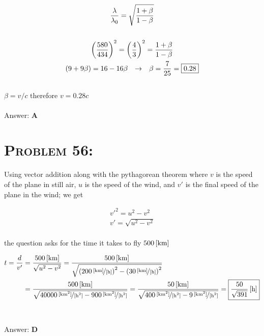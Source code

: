 \documentclass{article}
\begin{document}
\begin{gather}
\frac{\lambda}{\lambda_{0}} = \sqrt{\frac{1+\beta}{1-\beta}}\\
\nonumber\\
\left(\frac{580}{434}\right)^{2} = \left(\frac{4}{3}\right)^{2} = \frac{1+\beta}{1-\beta}\nonumber\\
(9 + 9 \beta) = 16 - 16 \beta \hspace{.1in} \rightarrow \hspace{.1in} \beta = \frac{7}{25} = \boxed{0.28}\nonumber
\end{gather}
\\
$\beta = v/c$ therefore $v = 0.28 c$
\\\\
Answer: \textbf{\textcolor{ProcessBlue}A}\\


\section{\textsc{Problem 56:}} Using vector addition along with the pythagorean theorem where $v$ is the speed of the plane in still air, $u$ is the speed of the wind, and $v'$ is the final speed of the plane in the wind; we get

\begin{gather}
v'^{2} = u^{2} - v^{2}\nonumber\\
v' = \sqrt{u^{2} - v^{2}}\nonumber
\end{gather}
\\
the question asks for the time it takes to fly $\unit[500]{[km]}$

\begin{align}
t = \frac{d}{v'} &= \frac{\unit[500]{[km]}}{\sqrt{u^{2} - v^{2}}} =  \frac{\unit[500]{[km]}}{\sqrt{\left(\unitfrac[200]{[km]}{[h]}\right)^{2} - \left(\unitfrac[30]{[km]}{[h]}\right)^{2}}}\nonumber\\
&= \frac{\unit[500]{[km]}}{\sqrt{\unitfrac[40000]{[km^{2}]}{[h^{2}]} - \unitfrac[900]{[km^{2}]}{[h^{2}]}}}=  \frac{\unit[50]{[km]}}{\sqrt{\unitfrac[400]{[km^{2}]}{[h^{2}]} - \unitfrac[9]{[km^{2}]}{[h^{2}]}}} = \boxed{\unit[\frac{50}{\sqrt{391}}]{[h]}}\nonumber
\end{align}
\\\\
Answer: \textbf{\textcolor{ProcessBlue}D}\\

\end{document}
